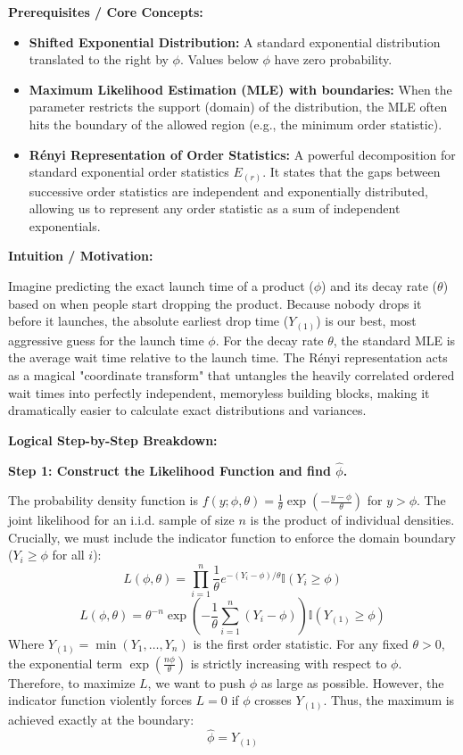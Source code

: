 \begin{solution}
\textbf{Prerequisites / Core Concepts:}
\begin{itemize}
    \item \textbf{Shifted Exponential Distribution:} A standard exponential distribution translated to the right by $\phi$. Values below $\phi$ have zero probability.
    \item \textbf{Maximum Likelihood Estimation (MLE) with boundaries:} When the parameter restricts the support (domain) of the distribution, the MLE often hits the boundary of the allowed region (e.g., the minimum order statistic).
    \item \textbf{Rényi Representation of Order Statistics:} A powerful decomposition for standard exponential order statistics $E_{(r)}$. It states that the gaps between successive order statistics are independent and exponentially distributed, allowing us to represent any order statistic as a sum of independent exponentials.
\end{itemize}

\textbf{Intuition / Motivation:}

Imagine predicting the exact launch time of a product ($\phi$) and its decay rate ($\theta$) based on when people start dropping the product. Because nobody drops it before it launches, the absolute earliest drop time ($Y_{(1)}$) is our best, most aggressive guess for the launch time $\phi$. For the decay rate $\theta$, the standard MLE is the average wait time relative to the launch time. The Rényi representation acts as a magical "coordinate transform" that untangles the heavily correlated ordered wait times into perfectly independent, memoryless building blocks, making it dramatically easier to calculate exact distributions and variances.

\textbf{Logical Step-by-Step Breakdown:}

\textbf{Step 1: Construct the Likelihood Function and find $\hat{\phi}$.}

The probability density function is $f(y; \phi, \theta) = \frac{1}{\theta} \exp\left(-\frac{y-\phi}{\theta}\right)$ for $y > \phi$.
The joint likelihood for an i.i.d. sample of size $n$ is the product of individual densities. Crucially, we must include the indicator function to enforce the domain boundary ($Y_i \geq \phi$ for all $i$):
\[ L(\phi, \theta) = \prod_{i=1}^n \frac{1}{\theta} e^{-(Y_i - \phi)/\theta} \mathbb{I}(Y_i \ge \phi) \]
\[ L(\phi, \theta) = \theta^{-n} \exp\left( -\frac{1}{\theta} \sum_{i=1}^n (Y_i - \phi) \right) \mathbb{I}(Y_{(1)} \ge \phi) \]
Where $Y_{(1)} = \min(Y_1, \dots, Y_n)$ is the first order statistic.
For any fixed $\theta > 0$, the exponential term $\exp\left(\frac{n\phi}{\theta}\right)$ is strictly increasing with respect to $\phi$.
Therefore, to maximize $L$, we want to push $\phi$ as large as possible. However, the indicator function violently forces $L = 0$ if $\phi$ crosses $Y_{(1)}$. Thus, the maximum is achieved exactly at the boundary:
\[ \hat{\phi} = Y_{(1)} \]


\end{solution}
